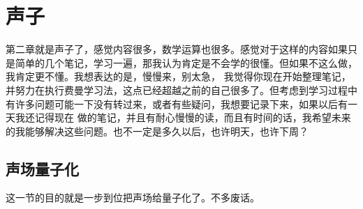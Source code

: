 \chapter{声子}
第二章就是声子了，感觉内容很多，数学运算也很多。感觉对于这样的内容如果只是简单的几个笔记，学习一遍，那我认为肯定是不会学的很懂。但如果不这么做，我肯定更不懂。我想表达的是，慢慢来，别太急，
我觉得你现在开始整理笔记，并努力在执行费曼学习法，这点已经超越之前的自己很多了。但考虑到学习过程中有许多问题可能一下没有转过来，或者有些疑问，我想要记录下来，如果以后有一天我还记得现在
做的笔记，并且有耐心慢慢的读，而且有时间的话，我希望未来的我能够解决这些问题。也不一定是多久以后，也许明天，也许下周？
\section{声场量子化}
这一节的目的就是一步到位把声场给量子化了。不多废话。
